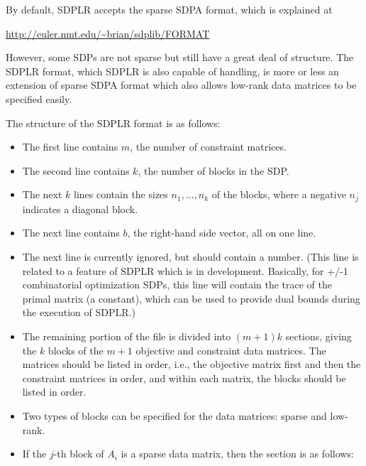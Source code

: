 \documentclass[12pt]{article}
\begin{document}
By default, SDPLR accepts the sparse SDPA format, which is
explained at
\begin{center}
\url{http://euler.nmt.edu/~brian/sdplib/FORMAT}
\end{center}
However, some SDPs are not sparse but still have a great deal of
structure. The SDPLR format, which SDPLR is also capable of
handling, is more or less an extension of sparse SDPA format which
also allows low-rank data matrices to be specified easily.

The structure of the SDPLR format is as follows:

\begin{itemize}

\item The first line contains $m$, the number of constraint
matrices.

\item The second line contains $k$, the number of blocks in the SDP.

\item The next $k$ lines contain the sizes $n_1, \ldots, n_k$ of the
blocks, where a negative $n_j$ indicates a diagonal block.

\item The next line contains $b$, the right-hand side vector, all
on one line.

\item The next line is currently ignored, but should contain a
number. (This line is related to a feature of SDPLR which is in
development. Basically, for +/-1 combinatorial optimization SDPs,
this line will contain the trace of the primal matrix (a
constant), which can be used to provide dual bounds during the
execution of SDPLR.)

\item The remaining portion of the file is divided into $(m+1)k$
sections, giving the $k$ blocks of the $m+1$ objective and constraint
data matrices. The matrices should be listed in order, i.e., the
objective matrix first and then the constraint matrices in order, and
within each matrix, the blocks should be listed in order.

\item Two types of blocks can be specified for the data matrices: sparse
and low-rank.

\item If the $j$-th block of $A_i$ is a sparse data matrix, then the
section is as follows:

\begin{itemize}


\end{itemize}
\end{itemize}
\end{document}
